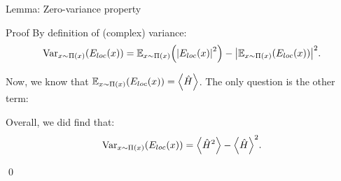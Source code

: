 \documentclass[a4paper]{article}
\begin{document}
\begin{parag}{Lemma: Zero-variance property}
    \begin{subparag}{Proof}
        By definition of (complex) variance:
        \[\Var_{x \followsdistr \Pi\left(x\right)}\left(E_{loc}\left(x\right)\right) = \exval_{x \followsdistr \Pi\left(x\right)}\left(\left|E_{loc}\left(x\right)\right|^2\right) - \left|\exval_{x \followsdistr \Pi\left(x\right)}\left(E_{loc}\left(x\right)\right)\right|^2.\]

        Now, we know that $\exval_{x \followsdistr \Pi\left(x\right)}\left(E_{loc}\left(x\right)\right) = \left\langle \hat{H} \right\rangle$. The only question is the other term: 
        
        Overall, we did find that:
        \[\Var_{x \followsdistr \Pi\left(x\right)}\left(E_{loc}\left(x\right)\right) = \left\langle \hat{H}^2 \right\rangle - \left\langle \hat{H} \right\rangle^2.\]

        \qed
    \end{subparag}
\end{parag}
\end{document}
